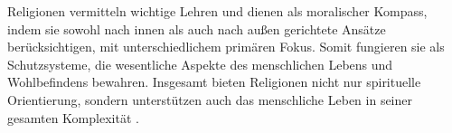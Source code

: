 Religionen vermitteln wichtige Lehren und dienen als moralischer Kompass, indem sie sowohl nach innen als auch nach außen gerichtete Ansätze berücksichtigen, mit unterschiedlichem primären Fokus. Somit fungieren sie als Schutzsysteme, die wesentliche Aspekte des menschlichen Lebens und Wohlbefindens bewahren. Insgesamt bieten Religionen nicht nur spirituelle Orientierung, sondern unterstützen auch das menschliche Leben in seiner gesamten Komplexität \parencite{OxfordDic}.





